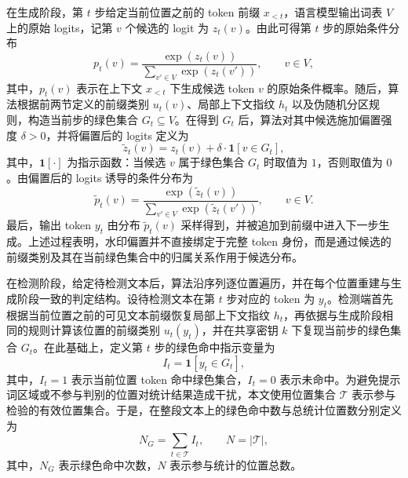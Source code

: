 在生成阶段，第 $t$ 步给定当前位置之前的 token 前缀 $x_{<t}$，语言模型输出词表 $V$ 上的原始 logits，记第 $v$ 个候选的 logit 为 $z_t(v)$。由此可得第 $t$ 步的原始条件分布
\begin{equation}
p_t(v)=\frac{\exp(z_t(v))}{\sum_{v' \in V}\exp(z_t(v'))}, \qquad v\in V,
\label{eq:wm_raw_dist}
\end{equation}
其中，$p_t(v)$ 表示在上下文 $x_{<t}$ 下生成候选 token $v$ 的原始条件概率。随后，算法根据前两节定义的前缀类别 $u_t(v)$、局部上下文指纹 $h_t$ 以及伪随机分区规则，构造当前步的绿色集合 $G_t \subseteq V$。在得到 $G_t$ 后，算法对其中候选施加偏置强度 $\delta>0$，并将偏置后的 logits 定义为
\begin{equation}
\widetilde{z}_t(v)=z_t(v)+\delta \cdot \mathbf{1}[v\in G_t],
\label{eq:wm_biased_logits}
\end{equation}
其中，$\mathbf{1}[\cdot]$ 为指示函数：当候选 $v$ 属于绿色集合 $G_t$ 时取值为 $1$，否则取值为 $0$。由偏置后的 logits 诱导的条件分布为
\begin{equation}
\widetilde{p}_t(v)=\frac{\exp(\widetilde{z}_t(v))}{\sum_{v' \in V}\exp(\widetilde{z}_t(v'))}, \qquad v\in V.
\label{eq:wm_biased_dist}
\end{equation}
最后，输出 token $y_t$ 由分布 $\widetilde{p}_t(v)$ 采样得到，并被追加到前缀中进入下一步生成。上述过程表明，水印偏置并不直接绑定于完整 token 身份，而是通过候选的前缀类别及其在当前绿色集合中的归属关系作用于候选分布。

在检测阶段，给定待检测文本后，算法沿序列逐位置遍历，并在每个位置重建与生成阶段一致的判定结构。设待检测文本在第 $t$ 步对应的 token 为 $y_t$。检测端首先根据当前位置之前的可见文本前缀恢复局部上下文指纹 $h_t$，再依据与生成阶段相同的规则计算该位置的前缀类别 $u_t(y_t)$，并在共享密钥 $k$ 下复现当前步的绿色集合 $G_t$。在此基础上，定义第 $t$ 步的绿色命中指示变量为
\begin{equation}
I_t=\mathbf{1}[y_t \in G_t],
\label{eq:wm_hit_indicator}
\end{equation}
其中，$I_t=1$ 表示当前位置 token 命中绿色集合，$I_t=0$ 表示未命中。为避免提示词区域或不参与判别的位置对统计结果造成干扰，本文使用位置集合 $\mathcal{T}$ 表示参与检验的有效位置集合。于是，在整段文本上的绿色命中数与总统计位置数分别定义为
\begin{equation}
N_G=\sum_{t\in \mathcal{T}} I_t,
\qquad
N=|\mathcal{T}|,
\label{eq:wm_ng_n}
\end{equation}
其中，$N_G$ 表示绿色命中次数，$N$ 表示参与统计的位置总数。

